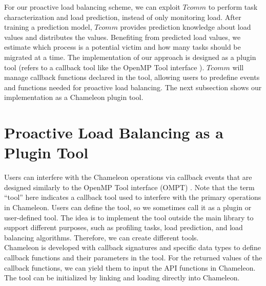 For our proactive load balancing scheme, we can exploit $Tcomm$ to perform task characterization and load prediction, instead of only monitoring load. After training a prediction model, $Tcomm$ provides prediction knowledge about load values and distributes the values. Benefiting from predicted load values, we estimate which process is a potential victim and how many tasks should be migrated at a time. The implementation of our approach is designed as a plugin tool (refers to a callback tool like the OpenMP Tool interface \cite{eichenberger2013omptool}). $Tcomm$ will manage callback functions declared in the tool, allowing users to predefine events and functions needed for proactive load balancing. The next subsection shows our implementation as a Chameleon plugin tool.


\section{Proactive Load Balancing as a Plugin Tool} \label{sec:cham_proactlb_tool}

Users can interfere with the Chameleon operations via callback events that are designed similarly to the OpenMP Tool interface (OMPT)\cite{eichenberger2013omptool} \cite{supinski2022omptechreport}. Note that the term ``tool'' here indicates a callback tool used to interfere with the primary operations in Chameleon. Users can define the tool, so we sometimes call it as a plugin or user-defined tool. The idea is to implement the tool outside the main library to support different purposes, such as profiling tasks, load prediction, and load balancing algorithms. Therefore, we can create different tools. \\

Chameleon is developed with callback signatures and specific data types to define callback functions and their parameters in the tool. For the returned values of the callback functions, we can yield them to input the API functions in Chameleon. The tool can be initialized by linking and loading directly into Chameleon. \\

